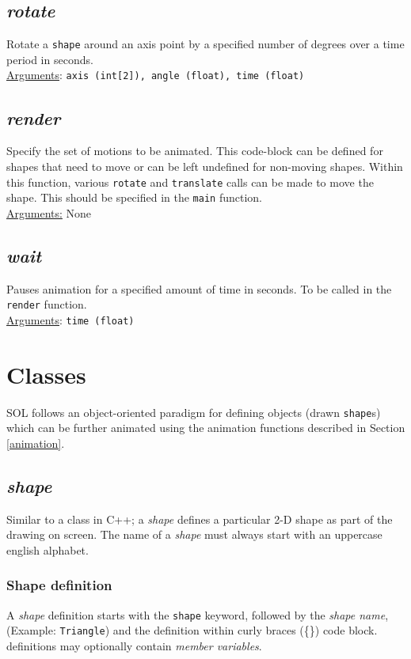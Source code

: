     \subsection{\textit{rotate}}
    Rotate a \texttt{shape} around an axis point by a specified number of degrees over a time period in seconds.\\
    \underline{Arguments}: \texttt{axis (int[2]), angle (float), time (float)}

    \subsection{\textit{render}}
    Specify the set of motions to be animated. This code-block can be defined for shapes that need to move or can be left undefined for non-moving shapes. Within this function, various \texttt{rotate} and \texttt{translate} calls can be made to move the shape. This should be specified in the \texttt{main} function.\\
    \underline{Arguments:} None

    \subsection{\textit{wait}}
    Pauses animation for a specified amount of time in seconds. To be called in the \texttt{render} function.\\
    \underline{Arguments}: \texttt{time (float)}


\section{Classes} \label{classes}
SOL follows an object-oriented paradigm for defining objects (drawn \texttt{shape}s) which can be further animated using the animation functions described in Section \ref{animation}.

    \subsection{\textit{shape}}
    Similar to a class in C++; a \textit{shape} defines a particular 2-D shape as part of the drawing on screen. The name of a \textit{shape} must always start with an uppercase english alphabet.

    \subsubsection{Shape definition}
    A \textit{shape} definition starts with the \texttt{shape} keyword, followed by the \textit{shape name},(Example: \texttt{Triangle}) and the definition within curly braces (\{\}) code block.  definitions may optionally contain \textit{member variables}.\\
    
